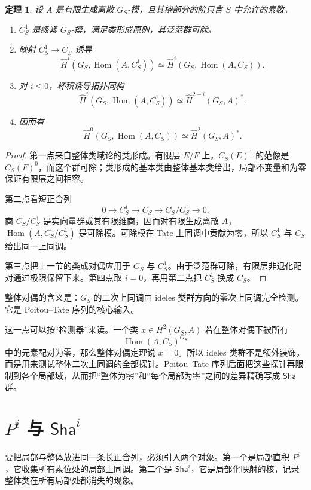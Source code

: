 \documentclass[11pt,a4paper,openany]{ctexbook}
\numberwithin{equation}{chapter}
\newcommand{\Hom}{\operatorname{Hom}}
\newcommand{\Sha}{\mathsf{Sha}}
\theoremstyle{plain}
\newtheorem{theorem}{定理}[chapter]
\theoremstyle{definition}
\theoremstyle{remark}
\begin{document}
\begin{theorem}
设 $A$ 是有限生成离散 $G_S$-模，且其挠部分的阶只含 $S$ 中允许的素数。
\begin{enumerate}[label=(\arabic*)]
\item $C_S^1$ 是级紧 $G_S$-模，满足类形成原则，其泛范群可除。
\item 映射 $C_S^1\to C_S$ 诱导
\[
\widehat H^i(G_S,\Hom(A,C_S^1))
\simeq
\widehat H^i(G_S,\Hom(A,C_S)).
\]
\item 对 $i\leq 0$，杯积诱导拓扑同构
\[
\widehat H^i(G_S,\Hom(A,C_S^1))
\simeq \widehat H^{2-i}(G_S,A)^*.
\]
\item 因而有
\[
\widehat H^0(G_S,\Hom(A,C_S))\simeq \widehat H^2(G_S,A)^*.
\]
\end{enumerate}
\end{theorem}

\begin{proof}
第一点来自整体类域论的类形成。有限层 $E/F$ 上，$C_S(E)^1$ 的范像是 $C_S(F)^0$，而这个群可除；类形成的基本类由整体基本类给出，局部不变量和为零保证有限层之间相容。

第二点看短正合列
\[
0\to C_S^1\to C_S\to C_S/C_S^1\to 0.
\]
商 $C_S/C_S^1$ 是实向量群或其有限维商，因而对有限生成离散 $A$，$\Hom(A,C_S/C_S^1)$ 是可除模。可除模在 Tate 上同调中贡献为零，所以 $C_S^1$ 与 $C_S$ 给出同一上同调。

第三点把上一节的类成对偶应用于 $G_S$ 与 $C_S^1$。由于泛范群可除，有限层非退化配对通过极限保留下来。第四点取 $i=0$，再用第二点把 $C_S^1$ 换成 $C_S$。
\end{proof}

整体对偶的含义是：$G_S$ 的二次上同调由 ideles 类群方向的零次上同调完全检测。它是 Poitou--Tate 序列的核心输入。

这一点可以按“检测器”来读。一个类 $x\in H^2(G_S,A)$ 若在整体对偶下被所有
\[
\Hom(A,C_S)^{G_S}
\]
中的元素配对为零，那么整体对偶定理说 $x=0$。所以 ideles 类群不是额外装饰，而是用来测试整体二次上同调的全部探针。Poitou--Tate 序列后面把这些探针再限制到各个局部域，从而把“整体为零”和“每个局部为零”之间的差异精确写成 $\Sha$ 群。

\section[Pi 与 Sha]{$P^i$ 与 $\Sha^i$}

要把局部与整体放进同一条长正合列，必须引入两个对象。第一个是局部直积 $P^i$，它收集所有素位处的局部上同调。第二个是 $\Sha^i$，它是局部化映射的核，记录整体类在所有局部处都消失的现象。
\end{document}

